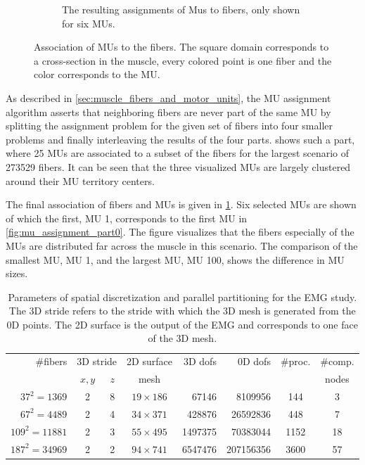 \begin{figure}
\begin{subfigure}[t]{0.47\textwidth}
    \caption{The resulting assignments of Mus to fibers, only shown for six MUs.}%
    \label{fig:mu_assignment_total}%
  \end{subfigure} 
  \caption{Association of MUs to the fibers. The square domain corresponds to a cross-section in the muscle, every colored point is one fiber and the color corresponds to the MU. }%
  \label{fig:mu_assignment_100}%
\end{figure}%

As described in \cref{sec:muscle_fibers_and_motor_units}, the MU assignment algorithm asserts that neighboring fibers are never part of the same MU by splitting the assignment problem for the given set of fibers into four smaller problems and finally interleaving the results of the four parts.  shows such a part, where 25 MUs are associated to a subset of the fibers for the largest scenario of \num{273529} fibers. It can be seen that the three visualized MUs are largely clustered around their MU territory centers.

The final association of fibers and MUs is given in \cref{fig:mu_assignment_total}. Six selected MUs are shown of which the first, MU 1, corresponds to the first MU in \cref{fig:mu_assignment_part0}. The figure visualizes that the fibers especially of the MUs are distributed far across the muscle in this scenario. The comparison of the smallest MU, MU 1, and the largest MU, MU 100, shows the difference in MU sizes.


\begin{table}
  \centering%
  \begin{tabular}{|r|c|c|c|r|r|c|c|}
    \hline
    \#fibers        & \multicolumn{2}{c|}{3D stride} & 2D surface  & 3D dofs    & 0D dofs & \#proc. & \#comp.\\
    \cline{2-3}
                  & $x,y$    & $z$                         & mesh   &      &  && nodes\\
    \hline
    $37^2=\num{1369}$          & 2     & 8 & $19 \times 186$  & \num{67146}     & \num{8109956}  & \num{144} & 3\\[2mm]  %
    $67^2=\num{4489}$          & 2     & 4 & $34 \times 371$  & \num{428876}     & \num{26592836}  & \num{448} & 7\\[2mm]  %
    $109^2=\num{11881}$          & 2     & 3 & $55 \times 495$  & \num{1497375}     & \num{70383044}  & \num{1152} & 18\\[2mm]  %
    $187^2=\num{34969}$          & 2     & 2 & $94 \times 741$  & \num{6547476}     & \num{207156356}  & \num{3600} & 57\\ %
    \hline
  \end{tabular}
  \caption{Parameters of spatial discretization and parallel partitioning for the EMG study. The 3D stride refers to the stride with which the 3D mesh is generated from the 0D points. The 2D surface is the output of the EMG and corresponds to one face of the 3D mesh.}%
  \label{tab:emg_study_parameters}%
\end{table}

